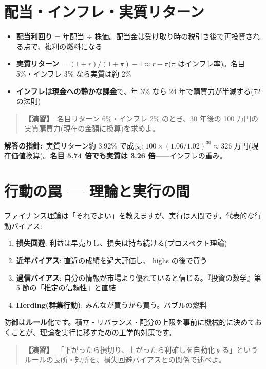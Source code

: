 \documentclass{article}
\begin{document}
\section{配当・インフレ・実質リターン}

\begin{itemize}
\item \textbf{配当利回り} = 年配当 ÷ 株価。配当金は受け取り時の税引き後で再投資される点で、複利の燃料になる
\item \textbf{実質リターン} = \((1 + r) / (1 + \pi) - 1 \approx r - \pi\)(\(\pi\) はインフレ率)。名目 5\%・インフレ 3\% なら実質は約 2\%
\item \textbf{インフレは現金への静かな課金}で、年 3\% なら 24 年で購買力が半減する(72 の法則)
\end{itemize}

\begin{quote}
\textbf{【演習】}\ 名目リターン 6\%・インフレ 2\% のとき、30 年後の 100 万円の実質購買力(現在の金額に換算)を求めよ。
\end{quote}

\textbf{解答の指針:}\ 実質リターン約 3.92\% で成長: \(100 \times (1.06/1.02)^{30} \approx 326\) 万円(現在価値換算)。\textbf{名目 5.74 倍でも実質は 3.26 倍}——インフレの重み。

\section{行動の罠 — 理論と実行の間}

ファイナンス理論は「それでよい」を教えますが、実行は人間です。代表的な行動バイアス:
\begin{enumerate}
\item \textbf{損失回避}: 利益は早売りし、損失は持ち続ける(プロスペクト理論)
\item \textbf{近年バイアス}: 直近の成績を過大評価し、 highs の後で買う
\item \textbf{過信バイアス}: 自分の情報が市場より優れていると信じる。『投資の数学』第 5 節の「推定の信頼性」と直結
\item \textbf{Herding(群集行動)}: みんなが買うから買う。バブルの燃料
\end{enumerate}

防御は\textbf{ルール化}です。積立・リバランス・配分の上限を事前に機械的に決めておくことが、理論を実行に移すための工学的対策です。

\begin{quote}
\textbf{【演習】}\ 「下がったら損切り、上がったら利確しを自動化する」というルールの長所・短所を、損失回避バイアスとの関係で述べよ。
\end{quote}
\end{document}
